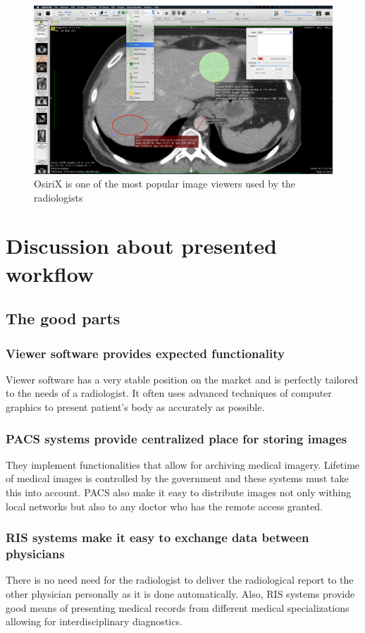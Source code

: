 \documentclass[12pt, twoside, openany]{report}
\theoremstyle{definition}
\begin{document}
\begin{figure}
    \centering
    \includegraphics[width=0.9\linewidth]{osirix}
    \caption{OsiriX is one of the most popular image viewers used by the radiologists}
    \label{fig:osirix}
\end{figure}



\section{Discussion about presented workflow}
\subsection{The good parts}
\subsubsection{Viewer software provides expected functionality}
Viewer software has a very stable position on the market and is perfectly tailored to the needs of a radiologist. It often uses advanced techniques of computer graphics to present patient's body as accurately as possible.
\subsubsection{PACS systems provide centralized place for storing images}
They implement functionalities that allow for archiving medical imagery. Lifetime of medical images is controlled by the government and these systems must take this into account. PACS also make it easy to distribute images not only withing local networks but also to any doctor who has the remote access granted.  
\subsubsection{RIS systems make it easy to exchange data between physicians}
There is no need need for the radiologist to deliver the radiological report to the other physician personally as it is done automatically. Also, RIS systems provide good means of presenting medical records from different medical specializations allowing for interdisciplinary diagnostics. 
\end{document}
